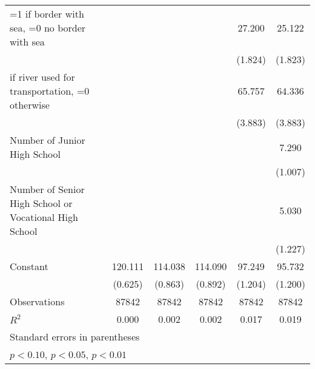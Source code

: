{\begin{tabular}{l*{5}{c}}
=1 if border with sea, =0 no border with sea&                     &                     &                     &      27.200\sym{***}&      25.122\sym{***}\\
                    &                     &                     &                     &     (1.824)         &     (1.823)         \\
\addlinespace
=1 if river used for transportation, =0 otherwise&                     &                     &                     &      65.757\sym{***}&      64.336\sym{***}\\
                    &                     &                     &                     &     (3.883)         &     (3.883)         \\
\addlinespace
Number of Junior High School&                     &                     &                     &                     &       7.290\sym{***}\\
                    &                     &                     &                     &                     &     (1.007)         \\
\addlinespace
Number of Senior High School or Vocational High School&                     &                     &                     &                     &       5.030\sym{***}\\
                    &                     &                     &                     &                     &     (1.227)         \\
\addlinespace
Constant            &     120.111\sym{***}&     114.038\sym{***}&     114.090\sym{***}&      97.249\sym{***}&      95.732\sym{***}\\
                    &     (0.625)         &     (0.863)         &     (0.892)         &     (1.204)         &     (1.200)         \\
\midrule
Observations        &       87842         &       87842         &       87842         &       87842         &       87842         \\
\(R^{2}\)           &       0.000         &       0.002         &       0.002         &       0.017         &       0.019         \\
\bottomrule
\multicolumn{6}{l}{\footnotesize Standard errors in parentheses}\\
\multicolumn{6}{l}{\footnotesize \sym{*} \(p<0.10\), \sym{**} \(p<0.05\), \sym{***} \(p<0.01\)}\\
\end{tabular}
}
